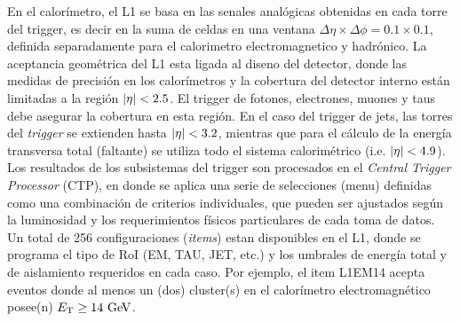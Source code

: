 En el calorímetro, el L1 se basa en las senales analógicas obtenidas en cada
torre del trigger, es decir en la suma de celdas en una ventana $\Delta \eta \times \Delta
\phi = 0.1 \times 0.1$, definida separadamente para el calorimetro electromagnetico y
hadrónico.
La aceptancia geométrica del L1 esta ligada al diseno del detector, donde las medidas de precisión en los
calorímetros y la cobertura del detector interno están limitadas a la región
$\abseta < 2.5$. El trigger de fotones, electrones, muones y taus debe asegurar
la cobertura en esta región. En el caso del trigger de jets, las torres del \emph{trigger}
se extienden hasta $\abseta < 3.2$, mientras que para el cálculo de la energía
transversa total (faltante) se utiliza todo el sistema calorimétrico (i.e.
$\abseta < 4.9$). Los resultados de los subsistemas del trigger son procesados
en el \emph{Central Trigger Processor} (CTP), en donde se aplica una serie de
selecciones (menu) definidas como una combinación de criterios
individuales, que pueden ser ajustados según la luminosidad y los requerimientos
físicos particulares de cada toma de datos. Un total de 256 configuraciones
(\emph{items}) estan disponibles en el L1, donde se programa el tipo de RoI (EM,
TAU, JET, etc.) y los umbrales de energía total y de aislamiento requeridos en
cada caso. Por ejemplo, el item L1EM14 acepta eventos donde al menos un (dos)
cluster(s) en el calorímetro electromagnético posee(n) $\et \geq 14 \GeV$.

